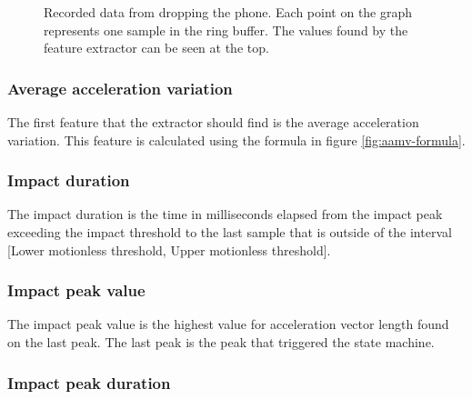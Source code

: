 \documentclass[12pt, a4paper, onecolumn]{article}
\begin{document}
	\begin{figure}[H]
		\centering
		\caption{Recorded data from dropping the phone. Each point on the graph represents one sample in the ring buffer. The values found by the feature extractor can be seen at the top.}%
		\label{fig:fall-data-example}%
	\end{figure}
	
	
	\subsubsection{Average acceleration variation}
	
	The first feature that the extractor should find is the average acceleration variation. This feature is calculated using the formula in figure \ref{fig:aamv-formula}. 
	
	\subsubsection{Impact duration}
	
	The impact duration is the time in milliseconds elapsed from the impact peak exceeding the impact threshold to the last sample that is outside of the interval [Lower motionless threshold, Upper motionless threshold].
	
	\subsubsection{Impact peak value}
	
	The impact peak value is the highest value for acceleration vector length found on the last peak. The last peak is the peak that triggered the state machine.
	
	\subsubsection{Impact peak duration}
	
\end{document}
